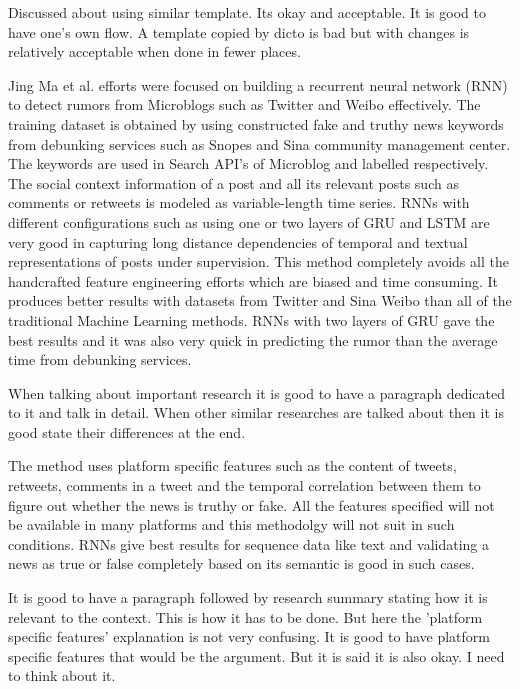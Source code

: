 \documentclass[a4paper, 11pt]{article}
\begin{document}
\color{red}
Discussed about using similar template. Its okay and acceptable. It is good to have one's own flow. A template copied by dicto is bad but with changes is relatively acceptable when done in fewer places. 
\color{black}

Jing Ma et al. efforts were focused on building a recurrent neural network (RNN) to detect rumors from Microblogs such as Twitter and Weibo effectively. The training dataset is obtained by using constructed fake and truthy news keywords from debunking services such as Snopes and Sina community management center. The keywords are used in Search API's of Microblog and labelled respectively. The social context information of a post and all its relevant posts such as comments or retweets is modeled as variable-length time series. RNNs with different configurations such as using one or two layers of GRU and LSTM are very good in capturing long distance dependencies of temporal and textual representations of posts under supervision. This method completely avoids all the handcrafted feature engineering efforts which are biased and time consuming. It produces better results with datasets from Twitter and Sina Weibo than all of the traditional Machine Learning methods. RNNs with two layers of GRU gave the best results and it was also very quick in predicting the rumor than the average time from debunking services\cite{Ma}.

\color{red}
When talking about important research it is good to have a paragraph dedicated to it and talk in detail. When other similar researches are talked about then it is good state their differences at the end.
\color{black}

The method uses platform specific features such as the content of tweets, retweets, comments in a tweet and the temporal correlation between them to figure out whether the news is truthy or fake. All the features specified will not be available in many platforms and this methodolgy will not suit in such conditions. RNNs give best results for sequence data like text and validating a news as true or false completely based on its semantic is good in such cases.

\color{red}
It is good to have a paragraph followed by research summary stating how it is relevant to the context. This is how it has to be done. But here the 'platform specific features' explanation is not very confusing. It is good to have platform specific features that would be the argument. But it is said it is also okay. I need to think about it. 
\color{black}
\end{document}
